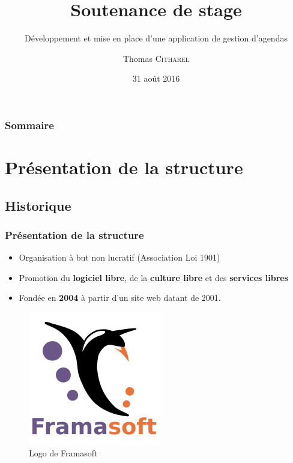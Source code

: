 \documentclass[12pt]{beamer}
\author{Thomas \textsc{Citharel}}
\title{Soutenance de stage}
\subtitle{Développement et mise en place d'une application de gestion d'agendas}
\institute{IUT d'Orléans}
\date{31 août 2016}
\begin{document}
	\maketitle
	
	\begin{frame}
		\frametitle{Sommaire}
		\tableofcontents
	\end{frame}
	\section{Présentation de la structure}
	\subsection{Historique}
	\begin{frame}
		\frametitle{Présentation de la structure}
		
		\begin{minipage}{0.45\textwidth}
			\begin{flushleft}
				\begin{itemize}
					\item Organisation à but non lucratif (Association Loi 1901)
					\item Promotion du \textbf{logiciel libre}, de la \textbf{culture libre} et des \textbf{services libres}
					\item Fondée en \textbf{2004} à partir d'un site web datant de 2001.
				\end{itemize}
			\end{flushleft}
		\end{minipage}
		\begin{minipage}{0.45\textwidth}
			\begin{flushright}
				\begin{figure}
					\centering
					\includegraphics[width=0.7\linewidth]{images/Framasoft-Logo}
					\caption{Logo de Framasoft}
					\label{fig:framasoft-logo}
				\end{figure}
			\end{flushright}
		\end{minipage}
	\end{frame}
\end{document}
